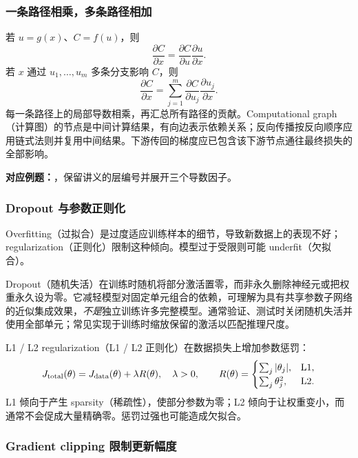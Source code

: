 \subsubsection{一条路径相乘，多条路径相加}

若 $u=g(x)$、$C=f(u)$，则
\[
  \frac{\partial C}{\partial x}
  =\frac{\partial C}{\partial u}\frac{\partial u}{\partial x}.
\]
若 $x$ 通过 $u_1,\ldots,u_m$ 多条分支影响 $C$，则
\[
  \boxed{\frac{\partial C}{\partial x}
  =\sum_{j=1}^m\frac{\partial C}{\partial u_j}
                    \frac{\partial u_j}{\partial x}.}
\]
每一条路径上的局部导数相乘，再汇总所有路径的贡献。Computational graph（计算图）的节点是中间计算结果，有向边表示依赖关系；反向传播按反向顺序应用链式法则并复用中间结果。下游传回的梯度应已包含该下游节点通往最终损失的全部影响。

\textbf{对应例题：}，保留讲义的层编号并展开三个导数因子。


\subsubsection{Dropout 与参数正则化}

Overfitting（过拟合）是过度适应训练样本的细节，导致新数据上的表现不好；regularization（正则化）限制这种倾向。模型过于受限则可能 underfit（欠拟合）。

Dropout（随机失活）在训练时随机将部分激活置零，而非永久删除神经元或把权重永久设为零。它减轻模型对固定单元组合的依赖，可理解为具有共享参数子网络的近似集成效果，\emph{不是}独立训练许多完整模型。通常验证、测试时关闭随机失活并使用全部单元；常见实现于训练时缩放保留的激活以匹配推理尺度。

L1 / L2 regularization（L1 / L2 正则化）在数据损失上增加参数惩罚：
\[
  J_{\rm total}(\theta)=J_{\rm data}(\theta)+\lambda R(\theta),
  \quad\lambda>0,
  \qquad
  R(\theta)=
  \begin{cases}
    \sum_j|\theta_j|,&\text{L1},\\
    \sum_j\theta_j^2,&\text{L2}.
  \end{cases}
\]
L1 倾向于产生 sparsity（稀疏性），使部分参数为零；L2 倾向于让权重变小，而通常不会促成大量精确零。惩罚过强也可能造成欠拟合。

\subsubsection{Gradient clipping 限制更新幅度}

